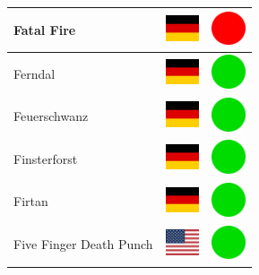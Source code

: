 \documentclass[12pt, a4paper, twoside]{report}
\begin{document}
\begin{center}
\begin{longtable}{|p{5cm}|p{2cm}|p{2cm}|}
Fatal Fire & \includegraphics[width=1cm]{4x3/de} & \includegraphics[width=1cm]{likes/n} \\ \hline
Ferndal & \includegraphics[width=1cm]{4x3/de} & \includegraphics[width=1cm]{likes/y} \\ \hline
Feuerschwanz & \includegraphics[width=1cm]{4x3/de} & \includegraphics[width=1cm]{likes/y} \\ \hline
Finsterforst & \includegraphics[width=1cm]{4x3/de} & \includegraphics[width=1cm]{likes/y} \\ \hline
Firtan & \includegraphics[width=1cm]{4x3/de} & \includegraphics[width=1cm]{likes/y} \\ \hline
Five Finger Death Punch & \includegraphics[width=1cm]{4x3/us} & \includegraphics[width=1cm]{likes/y} \\ \hline

\end{longtable}
\end{center}
\end{document}
